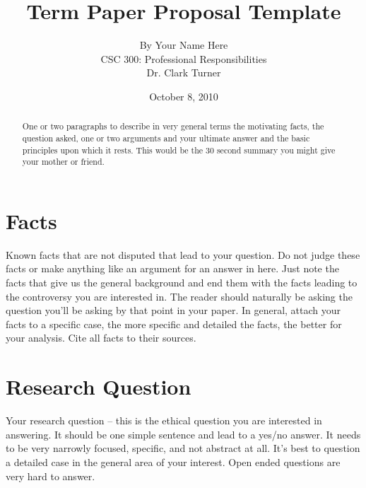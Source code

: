 \documentclass[12pt]{article}
\begin{document}
\title{\vfill Term Paper Proposal Template} %
\author{
By Your Name Here \vspace{10pt} \\
CSC 300: Professional Responsibilities  \vspace{10pt} \\
Dr. Clark Turner \vspace{10pt} \\
}
\date{October 8, 2010} %

\maketitle

\vfill  %
\begin{abstract}
One or two paragraphs to describe in very general terms the motivating facts, the question asked, one or two arguments and your ultimate answer and the basic principles upon which it rests. This would be the 30 second summary you might give your mother or friend. \cite{handout}
\end{abstract}

\thispagestyle{empty} %
\newpage

\section{Facts}
Known facts that are not disputed that lead to your question. Do not judge these facts or make anything like an argument for an answer in here. Just note the facts that give us the general background and end them with the facts leading to the controversy you are interested in. The reader should naturally be asking the question you'll be asking by that point in your paper. In general, attach your facts to a specific case, the more specific and detailed the facts, the better for your analysis. Cite all facts to their sources. \cite{handout}

\section{Research Question}
Your research question -- this is the ethical question you are interested in answering. It should be one simple sentence and lead to a yes/no answer. It needs to be very narrowly focused, specific, and not abstract at all. It's best to question a detailed case in the general area of your interest. Open ended questions are very hard to answer. \cite{handout}
\end{document}
